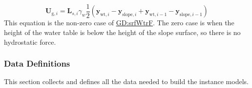 \documentclass[12pt]{article}
\begin{document}
\begin{displaymath}
{\symbf{U}_{\text{g},i}}={\symbf{L}_{s,i}} {γ_{w}} \frac{1}{2} \left({\symbf{y}_{\text{wt},i}}-{\symbf{y}_{\text{slope},i}}+{\symbf{y}_{\text{wt},i-1}}-{\symbf{y}_{\text{slope},i-1}}\right)
\end{displaymath}
This equation is the non-zero case of \hyperref[GD:srfWtrF]{GD:srfWtrF}. The zero case is when the height of the water table is below the height of the slope surface, so there is no hydrostatic force.

\subsubsection{Data Definitions}
\label{Sec:DDs}
This section collects and defines all the data needed to build the instance models.
\end{document}
